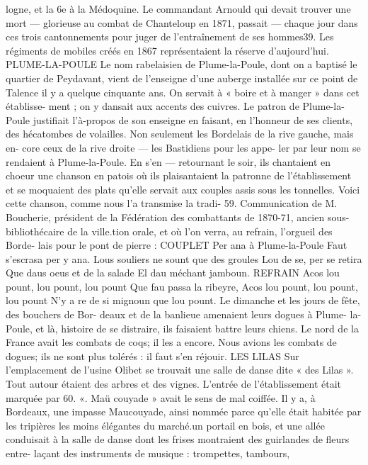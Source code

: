 \documentclass[a4paper,11pt]{book}
\begin{document}
logne, et la 6e à la Médoquine.
Le commandant Arnould
qui
devait
trouver une mort
—
glorieuse au combat de Chanteloup en 1871,
passait
—
chaque jour dans ces trois cantonnements pour juger de
l'entraînement de ses hommes39.
Les régiments de mobiles créés en 1867 représentaient la
réserve d'aujourd'hui.
PLUME-LA-POULE
Le nom rabelaisien de Plume-la-Poule, dont on a baptisé
le quartier de Peydavant, vient de l'enseigne d'une auberge
installée sur ce point de Talence il y a quelque cinquante
ans. On servait à « boire et à manger » dans cet établisse-
ment ; on y dansait aux accents des cuivres. Le patron
de Plume-la-Poule justifiait l'à-propos de son enseigne en
faisant, en l'honneur de ses clients, des hécatombes de
volailles.
Non seulement les Bordelais de la rive gauche, mais en-
core ceux de la rive droite — les Bastidiens pour les appe-
ler par leur nom se rendaient à Plume-la-Poule. En s'en
—
retournant le soir, ils chantaient en choeur une chanson en
patois où ils plaisantaient la patronne de l'établissement et
se moquaient des plats qu'elle servait aux couples assis sous
les tonnelles.
Voici cette chanson, comme nous l'a transmise la tradi-
59. Communication de M. Boucherie, président de la Fédération des
combattants de 1870-71, ancien sous-bibliothécaire de la ville.tion orale, et où l'on verra, au refrain, l'orgueil des Borde-
lais pour le pont de pierre :
COUPLET
Per ana à Plume-la-Poule
Faut s'escrasa per y ana.
Lous souliers ne sount que des groules
Lou de se, per se retira
Que daus oeus et de la salade
El dau méchant jamboun.
REFRAIN
Acos lou pount, lou pount, lou pount
Que fau passa la ribeyre,
Acos lou pount, lou pount, lou pount
N'y a re de si mignoun que lou pount.
Le dimanche et les jours de fête, des bouchers de Bor-
deaux et de la banlieue amenaient leurs dogues à Plume-
la-Poule, et là, histoire de se distraire, ils faisaient battre
leurs chiens.
Le nord de la France avait les combats de coqs; il les
a encore. Nous avions les combats de dogues; ils ne sont
plus tolérés : il faut s'en réjouir.
LES LILAS
Sur l'emplacement de l'usine Olibet se trouvait une salle
de danse dite « des Lilas ». Tout autour étaient des arbres
et des vignes. L'entrée de l'établissement était marquée par
60. «. Maü couyade » avait le sens de mal coiffée. Il y a, à Bordeaux,
une impasse Maucouyade, ainsi nommée parce qu'elle était habitée par
les tripières les moins élégantes du marché.un portail en bois, et une allée conduisait à la salle de danse
dont les frises montraient des guirlandes de fleurs entre-
laçant des instruments de musique : trompettes, tambours,
\end{document}
